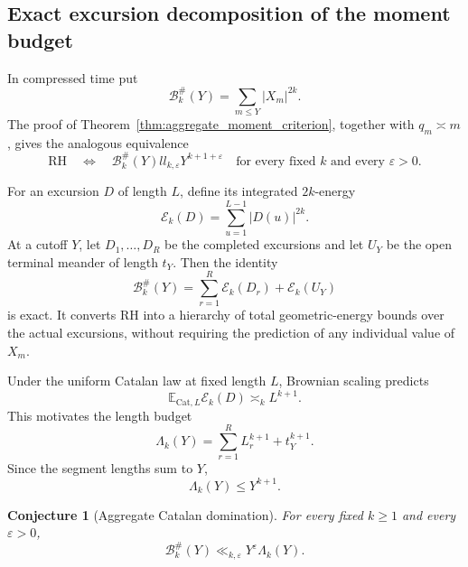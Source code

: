 \documentclass[11pt]{amsart}
\numberwithin{equation}{section}
\theoremstyle{plain}
\newtheorem{conjecture}[theorem]{Conjecture}
\theoremstyle{definition}
\theoremstyle{remark}
\newcommand{\E}{\mathbb{E}}
\newcommand{\eps}{\varepsilon}
\begin{document}
\subsection{Exact excursion decomposition of the moment budget}

In compressed time put
\begin{equation}
\mathcal B_k^{\#}(Y)=\sum_{m\leq Y}|X_m|^{2k}.
\label{eq:compressed_time_moment}
\end{equation}
The proof of Theorem~\ref{thm:aggregate_moment_criterion}, together with
$q_m\asymp m$, gives the analogous equivalence
\begin{equation}
\mathrm{RH}
\quad\Longleftrightarrow\quad
\mathcal B_k^{\#}(Y)ll_{k,\eps}Y^{k+1+\eps}
\quad\text{for every fixed $k$ and every $\eps>0$}.
\label{eq:compressed_moment_equivalence}
\end{equation}

For an excursion $D$ of length $L$, define its integrated $2k$-energy
\begin{equation}
\mathcal E_k(D)=\sum_{u=1}^{L-1}|D(u)|^{2k}.
\label{eq:excursion_integrated_energy}
\end{equation}
At a cutoff $Y$, let $D_1,\ldots,D_R$ be the completed excursions and let
$U_Y$ be the open terminal meander of length $t_Y$.  Then the identity
\begin{equation}
\boxed{
\mathcal B_k^{\#}(Y)
=
\sum_{r=1}^{R}\mathcal E_k(D_r)
+\mathcal E_k(U_Y)
}
\label{eq:exact_excursion_moment_decomposition}
\end{equation}
is exact.  It converts RH into a hierarchy of total geometric-energy bounds
over the actual excursions, without requiring the prediction of any
individual value of $X_m$.

Under the uniform Catalan law at fixed length $L$, Brownian scaling predicts
\begin{equation}
\E_{\mathrm{Cat},L}\mathcal E_k(D)
\asymp_k L^{k+1}.
\label{eq:catalan_integrated_moment_scale}
\end{equation}
This motivates the length budget
\begin{equation}
\Lambda_k(Y)
=
\sum_{r=1}^{R}L_r^{k+1}+t_Y^{k+1}.
\label{eq:length_moment_budget}
\end{equation}
Since the segment lengths sum to $Y$,
\begin{equation}
\Lambda_k(Y)\leq Y^{k+1}.
\label{eq:length_budget_convexity}
\end{equation}

\begin{conjecture}[Aggregate Catalan domination]
\label{conj:aggregate_catalan_domination}
For every fixed $k\geq1$ and every $\eps>0$,
\begin{equation}
\mathcal B_k^{\#}(Y)
\ll_{k,\eps}
Y^{\eps}\Lambda_k(Y).
\label{eq:aggregate_catalan_domination}
\end{equation}
\end{conjecture}
\end{document}
